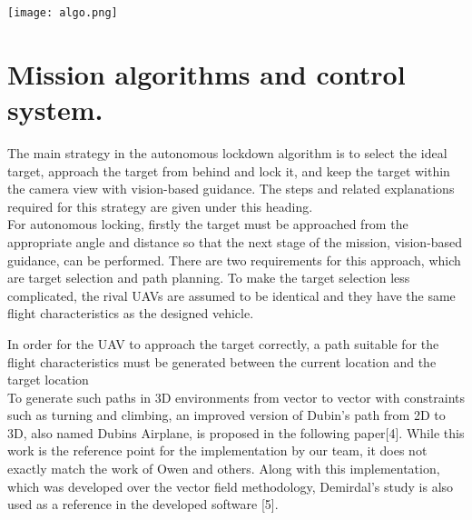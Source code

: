 \documentclass[a0paper,fontscale=0.5]{baposter} %
\begin{document}
\begin{poster}
{\begin{multicols}{2}
            \vspace{2em}



            \texttt{[image: algo.png]}

            \section*{Mission algorithms and control system.}
            The main strategy in the autonomous lockdown algorithm is to select the ideal target, approach the target from behind and lock it, and keep the target within the camera view with vision-based guidance. The steps and related explanations required for this strategy are given under this heading.\\
            For autonomous locking, firstly the target must be approached from the appropriate angle and distance so that the next stage of the mission, vision-based guidance, can be performed. There are two requirements for this approach, which are target selection and path planning. To make the target selection less complicated, the rival UAVs are assumed to be identical and they have the same flight characteristics as the designed vehicle.

            In order for the UAV to approach the target correctly, a path suitable for the flight characteristics must be generated between the current location and the target location\\

            To generate such paths in 3D environments from vector to vector with constraints such as turning and climbing, an improved version of Dubin's path from 2D to 3D, also named Dubins Airplane, is proposed in the following paper[4]. While this work is the reference point for the implementation by our team, it does not exactly match the work of Owen and others. Along with this implementation, which was developed over the vector field methodology, Demirdal’s study is also used as a reference in the developed software [5].

        \end{multicols}

    }

\end{poster}
\end{document}
